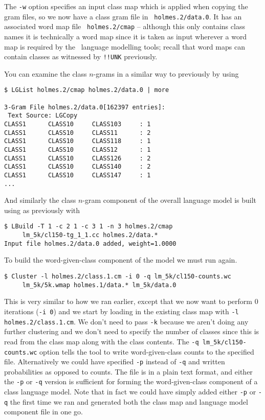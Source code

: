 The {\tt -w} option specifies an input class map which is applied when
copying the gram files, so we now have a class gram file in {\tt
holmes.2/data.0}.  It has an associated word map file {\tt
holmes.2/cmap} -- although this only contains class names it is
technically a word map since it is taken as input wherever a word map
is required by the \HTK\ language modelling tools; recall that word
maps can contain classes as witnessed by {\tt !!UNK} previously.

You can examine the class $n$-grams in a similar way to previously by
using 
\begin{verbatim}
$ LGList holmes.2/cmap holmes.2/data.0 | more 
 
3-Gram File holmes.2/data.0[162397 entries]:
 Text Source: LGCopy
CLASS1      CLASS10     CLASS103     : 1
CLASS1      CLASS10     CLASS11      : 2
CLASS1      CLASS10     CLASS118     : 1
CLASS1      CLASS10     CLASS12      : 1
CLASS1      CLASS10     CLASS126     : 2
CLASS1      CLASS10     CLASS140     : 2
CLASS1      CLASS10     CLASS147     : 1
...
\end{verbatim} %

And similarly the class $n$-gram component of the overall language
model is built using  as previously with
\begin{verbatim}
$ LBuild -T 1 -c 2 1 -c 3 1 -n 3 holmes.2/cmap
     lm_5k/cl150-tg_1_1.cc holmes.2/data.*
Input file holmes.2/data.0 added, weight=1.0000
\end{verbatim} %

To build the word-given-class component of the model we must run
 again.
\begin{verbatim}
$ Cluster -l holmes.2/class.1.cm -i 0 -q lm_5k/cl150-counts.wc
     lm_5k/5k.wmap holmes.1/data.* lm_5k/data.0
\end{verbatim} %

This is very similar to how we ran  earlier, except
that we now want to perform 0 iterations ({\tt -i 0}) and we start by
loading in the existing class map with {\tt -l holmes.2/class.1.cm}.
We don't need to pass {\tt -k} because we aren't doing any further
clustering and we don't need to specify the number of classes since
this is read from the class map along with the class contents.  The
{\tt -q lm\_5k/cl150-counts.wc} option tells the tool to write 
word-given-class counts to the specified file.  Alternatively we could
have specified {\tt -p} instead of {\tt -q} and written probabilities
as opposed to counts.  The file is in a plain text format, and either
the {\tt -p} or {\tt -q} version is sufficient for forming the
word-given-class component of a class language model.  Note that in
fact we could have simply added either {\tt -p} or {\tt -q} the
first time we ran  and generated both the class map and
language model component file in one go.


